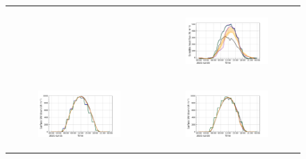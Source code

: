 \begin{figure}[hbtp]
\begin{tabular}{cc}
\begin{subfigure}[t]{0.5\textwidth}
        \end{subfigure} &
        \begin{subfigure}[t]{0.5\textwidth}
            \caption{}
            \includegraphics[width=\textwidth]{images/chap5/IOP_TS/TS_2021-07-20_elsplans_sens.png}
        \end{subfigure} \\
        \begin{subfigure}[t]{0.5\textwidth}
            \caption{}
            \includegraphics[width=\textwidth]{images/chap5/IOP_TS/TS_2021-07-15_elsplans_SWdnSFC.png}
        \end{subfigure} &
        \begin{subfigure}[t]{0.5\textwidth}
            \caption{}
            \includegraphics[width=\textwidth]{images/chap5/IOP_TS/TS_2021-07-20_elsplans_SWdnSFC.png}

\end{subfigure}
\end{tabular}
\end{figure}
